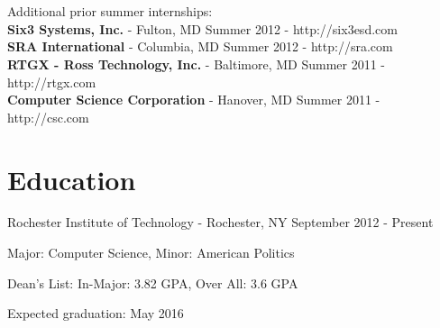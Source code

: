 \documentclass[a4paper,margin,line]{resume}
\newcommand{\rdate}[1]{\hfill {\small #1}}
\begin{document}
\begin{resume}
\begin{asparadesc}
        \normalsize
        \\
        \\
        Additional prior summer internships:\\
        \textbf{Six3 Systems, Inc.} - Fulton, MD \hfill Summer 2012 - http://six3esd.com \\
        \textbf{SRA International} - Columbia, MD \hfill Summer 2012 - http://sra.com \\
        \textbf{RTGX - Ross Technology, Inc.} - Baltimore, MD \hfill Summer 2011 - http://rtgx.com \\
        \textbf{Computer Science Corporation} - Hanover, MD \hfill Summer 2011 - http://csc.com
    \end{asparadesc}

\section{\mysidestyle Education}
	\begin{compactdesc}
		\item[Rochester Institute of Technology] - Rochester, NY \rdate{September 2012 - Present}
		\begin{compactitem} { \small
			\item Major: Computer Science, Minor: American Politics
            \item Dean's List: In-Major: 3.82 GPA, Over All: 3.6 GPA
			\item Expected graduation: May 2016
		} \end{compactitem}
	\end{compactdesc}


\end{resume}
\end{document}
